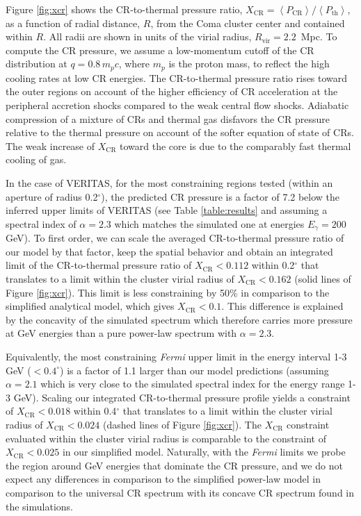 \documentclass[12pt,manuscript]{aastex}
\def\Fermi{{\em Fermi}\xspace}
\newcommand{\expval}[1]{\left\langle #1 \right\rangle}
\newcommand{\rmn}{\mathrm}
\newcommand{\CR}{\mathrm{CR}}
\begin{document}
Figure \ref{fig:xcr} shows the CR-to-thermal pressure ratio, $X_{\CR} =
\expval{P_{\CR}}/\expval{P_\rmn{th}}$, as a function of radial distance, $R$, from the Coma cluster
center and contained within $R$. All radii are shown in units of the virial radius,
$R_\rmn{vir}=2.2$~Mpc. To compute the CR pressure, we assume a low-momentum cutoff of the CR
distribution at $q = 0.8\,m_{p}c$, where $m_{p}$ is the proton mass, to reflect the high cooling
rates at low CR energies. The CR-to-thermal pressure ratio rises toward the outer regions
on account of the higher efficiency of CR acceleration at the peripheral accretion shocks compared
to the weak central flow shocks. Adiabatic compression of a mixture of CRs and thermal gas disfavors
the CR pressure relative to the thermal pressure on account of the softer equation of state of
CRs. The weak increase of $X_{\CR}$ toward the core is due to the comparably fast thermal cooling of
gas.

In the case of VERITAS, for the most constraining regions tested (within an aperture of radius
0.2$^{\circ}$), the predicted CR pressure is a factor of 7.2 below the inferred upper limits of
VERITAS (see Table \ref{table:results} and assuming a spectral index of $\alpha=2.3$ which matches
the simulated one at energies $E_\gamma=200$ GeV). To first order, we can scale the averaged
CR-to-thermal pressure ratio of our model by that factor, keep the spatial behavior and obtain an
integrated limit of the CR-to-thermal pressure ratio of $X_{\CR}<0.112$ within 0.2$^{\circ}$ that
translates to a limit within the cluster virial radius of $X_\CR<0.162$ (solid lines of Figure
\ref{fig:xcr}). This limit is less constraining by 50\% in comparison to the simplified analytical
model, which gives $X_\CR<0.1$. This difference is explained by the concavity of the simulated
spectrum which therefore carries more pressure at GeV energies than a pure power-law spectrum with
$\alpha=2.3$.

Equivalently, the most constraining \Fermi upper limit in the energy interval 1-3 GeV ($<0.4^\circ$)
is a factor of 1.1 larger than our model predictions (assuming $\alpha=2.1$ which is very close to
the simulated spectral index for the energy range 1-3 GeV). Scaling our integrated CR-to-thermal
pressure profile yields a constraint of $X_{\CR}<0.018$ within 0.4$^{\circ}$ that translates to a
limit within the cluster virial radius of $X_\CR<0.024$ (dashed lines of Figure \ref{fig:xcr}). The
$X_\CR$ constraint evaluated within the cluster virial radius is comparable to the constraint of
$X_\CR<0.025$ in our simplified model. Naturally, with the \Fermi limits we probe the region around
GeV energies that dominate the CR pressure, and we do not expect any differences in comparison to
the simplified power-law model in comparison to the universal CR spectrum with its concave CR
spectrum found in the simulations.
\end{document}
